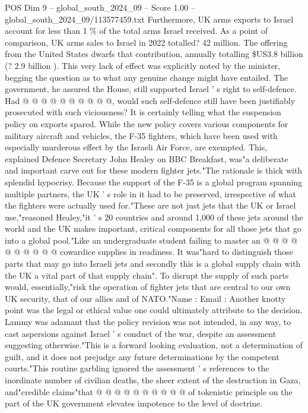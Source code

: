 \begin{textsample}{POS Dim 9 – global\_south\_2024\_09 – Score 1.00 – global\_south\_2024\_09/113577459.txt}
Furthermore, UK arms exports to Israel account for less than 1 \% of the total arms Israel received.
As a point of comparison, UK arms sales to Israel in 2022 totalled? 42 million.
The offering from the United States dwarfs that contribution, annually totalling \$US3.8 billion (? 2.9 billion ).
This very lack of effect was explicitly noted by the minister, begging the question as to what any genuine change might have entailed.
The government, he assured the House, still supported Israel ' s right to self-defence.
Had @ @ @ @ @ @ @ @ @ @, would such self-defence still have been justifiably prosecuted with such viciousness?
It is certainly telling what the suspension policy on exports spared.
While the new policy covers various components for military aircraft and vehicles, the F-35 fighters, which have been used with especially murderous effect by the Israeli Air Force, are exempted.
This, explained Defence Secretary John Healey on BBC Breakfast, was"a deliberate and important carve out for these modern fighter jets."The rationale is thick with splendid hypocrisy.
Because the support of the F-35 is a global program spanning multiple partners, the UK ' s role in it had to be preserved, irrespective of what the fighters were actually used for."These are not just jets that the UK or Israel use,"reasoned Healey,"it ' s 20 countries and around 1,000 of these jets around the world and the UK makes important, critical components for all those jets that go into a global pool."Like an undergraduate student failing to master an @ @ @ @ @ @ @ @ @ @ cowardice supplies in readiness.
It was"hard to distinguish those parts that may go into Israeli jets and secondly this is a global supply chain with the UK a vital part of that supply chain".
To disrupt the supply of such parts would, essentially,"risk the operation of fighter jets that are central to our own UK security, that of our allies and of NATO."Name : Email : Another knotty point was the legal or ethical value one could ultimately attribute to the decision.
Lammy was adamant that the policy revision was not intended, in any way, to cast aspersions against Israel ' s conduct of the war, despite an assessment suggesting otherwise."This is a forward looking evaluation, not a determination of guilt, and it does not prejudge any future determinations by the competent courts."This routine garbling ignored the assessment ' s references to the inordinate number of civilian deaths, the sheer extent of the destruction in Gaza, and"credible claims"that @ @ @ @ @ @ @ @ @ @ of tokenistic principle on the part of the UK government elevates impotence to the level of doctrine.

\end{textsample}
